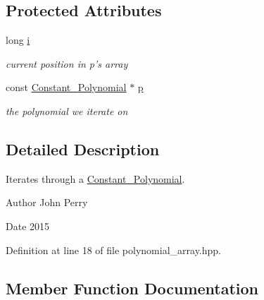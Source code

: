 \subsection*{Protected Attributes}
\begin{DoxyCompactItemize}
\item 
\mbox{\label{class_constant___polynomial___iterator_ab321ce25d6477f96450100cdc41090a6}} 
long \hyperlink{class_constant___polynomial___iterator_ab321ce25d6477f96450100cdc41090a6}{i}
\begin{DoxyCompactList}\small\item\em current position in p's array \end{DoxyCompactList}\item 
\mbox{\label{class_constant___polynomial___iterator_a5eb1e51bcc01a9da6dffd950a3e1b1ca}} 
const \hyperlink{class_constant___polynomial}{Constant\+\_\+\+Polynomial} $\ast$ \hyperlink{class_constant___polynomial___iterator_a5eb1e51bcc01a9da6dffd950a3e1b1ca}{p}
\begin{DoxyCompactList}\small\item\em the polynomial we iterate on \end{DoxyCompactList}\end{DoxyCompactItemize}


\subsection{Detailed Description}
Iterates through a \hyperlink{class_constant___polynomial}{Constant\+\_\+\+Polynomial}. 

\begin{DoxyAuthor}{Author}
John Perry 
\end{DoxyAuthor}
\begin{DoxyDate}{Date}
2015 
\end{DoxyDate}


Definition at line 18 of file polynomial\+\_\+array.\+hpp.



\subsection{Member Function Documentation}
\mbox{\label{class_constant___polynomial___iterator_aad50167fd2010a1a5c09358c777d40e0}} 

